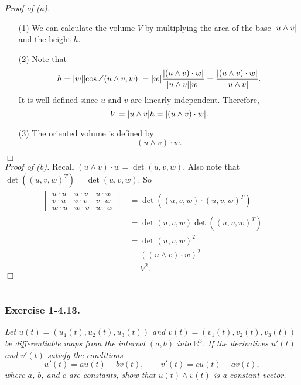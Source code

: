 \documentclass{article}
\begin{document}
\emph{Proof of (a).}
\begin{enumerate}
\item[(1)]
  We can calculate the volume $V$ by
  multiplying the area of the base $\abs{u \wedge v}$ and the height $h$.

\item[(2)]
  Note that
  \[
    h
    = |w| \abs{\cos\angle(u \wedge v, w)}
    = |w| \frac{\abs{(u \wedge v) \cdot w}}{\abs{u \wedge v}|w|}
    = \frac{\abs{(u \wedge v) \cdot w}}{\abs{u \wedge v}}.
  \]
  It is well-defined since $u$ and $v$ are linearly independent.
  Therefore,
  \[
    V = \abs{u \wedge v} h = \abs{(u \wedge v) \cdot w}.
  \]

\item[(3)]
  The oriented volume is defined by
  \[
    (u \wedge v) \cdot w.
  \]
\end{enumerate}
$\Box$ \\



\emph{Proof of (b).}
  Recall $(u \wedge v) \cdot w = \det(u,v,w)$.
  Also note that $\det((u,v,w)^{T}) = \det(u,v,w)$.
  So
  \begin{align*}
    \begin{vmatrix}
      u \cdot u & u \cdot v & u \cdot w \\
      v \cdot u & v \cdot v & v \cdot w \\
      w \cdot u & w \cdot v & w \cdot w
    \end{vmatrix}
    &= \det((u,v,w) \cdot (u,v,w)^{T}) \\
    &= \det(u,v,w) \det((u,v,w)^{T}) \\
    &= \det(u,v,w)^2 \\
    &= ((u \wedge v) \cdot w)^2 \\
    &= V^2.
  \end{align*}
$\Box$ \\\\






\subsubsection*{Exercise 1-4.13.}
\emph{Let $u(t) = (u_1(t), u_2(t), u_3(t))$ and $v(t) = (v_1(t), v_2(t), v_3(t))$
be differentiable maps from the interval $(a,b)$ into $\mathbb{R}^3$.
If the derivatives $u'(t)$ and $v'(t)$ satisfy the conditions
\[
  u'(t) = au(t) + bv(t),
  \qquad
  v'(t) = cu(t) - av(t),
\]
where $a$, $b$, and $c$ are constants, show that
$u(t) \wedge v(t)$ is a constant vector.} \\
\end{document}
